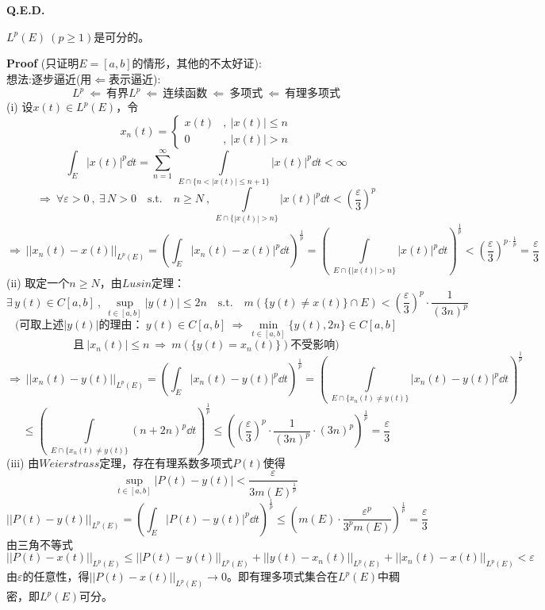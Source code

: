 \textbf{Q.E.D.}
\begin{theorem}
    $L^p(E) \ (p \geq 1)$是可分的。
\end{theorem}
\textbf{Proof} (只证明$E=[a,b]$的情形，其他的不太好证):\\
想法:逐步逼近(用$\Leftarrow$表示逼近):
\[L^p \ \Leftarrow \ \text{有界}L^p \ \Leftarrow \ \text{连续函数} \ \Leftarrow \ \text{多项式} \ \Leftarrow \ \text{有理多项式}\]
(i) 设$x(t) \in L^p(E)$，令
\[x_n(t)=\left \{
\begin{array}{ll}
    x(t) & , \ |x(t)| \leq n \\ 0 & , \ |x(t)|>n
\end{array}
\right.
\]
\[\int_E|x(t)|^p\dd t=\sum_{n=1}^{\infty} \ \int\limits_{E \cap \{n<|x(t)| \leq n+1\}}|x(t)|^p\dd t<\infty\]
\[\Rightarrow \ \forall \varepsilon>0 \ , \ \exists \, N>0 \quad \text{s.t.} \quad n \geq N \ , \ \int\limits_{E \cap \{|x(t)|>n\}}|x(t)|^p\dd t<\left(\frac{\varepsilon}{3}\right)^p\]
\[\Rightarrow \ ||x_n(t)-x(t)||_{L^p(E)}=\left(\int_E|x_n(t)-x(t)|^p\dd t\right)^{\frac{1}{p}}=\left( \ \int\limits_{E \cap \{|x(t)|>n\}}|x(t)|^p\dd t\right)^{\frac{1}{p}}<\left(\frac{\varepsilon}{3}\right)^{p \cdot \frac{1}{p}}=\frac{\varepsilon}{3}\]
(ii) 取定一个$n \geq N$，由$Lusin$定理：
\[\exists \, y(t) \in C[a,b] \ , \ \mathop \text{sup}\limits_{t \in [a,b]}|y(t)| \leq 2n \quad \text{s.t.} \quad m(\{y(t) \neq x(t)\} \cap E)<\left(\frac{\varepsilon}{3}\right)^p \cdot \frac{1}{(3n)^p}\]
\[(\text{可取上述$|y(t)|$的理由：} \ y(t) \in C[a,b] \ \Rightarrow \ \mathop \text{min}\limits_{t \in [a,b]}\{y(t),2n\} \in C[a,b]\]
\[\text{且} \ |x_n(t)| \leq n \ \Rightarrow \ m(\{y(t)=x_n(t)\})\text{不受影响})\]
\[\Rightarrow \ ||x_n(t)-y(t)||_{L^p(E)}=\left(\int_E|x_n(t)-y(t)|^p\dd t\right)^{\frac{1}{p}}=\left( \ \int\limits_{E \cap \{x_n(t) \neq y(t)\}}|x_n(t)-y(t)|^p\dd t\right)^{\frac{1}{p}}\]
\[\leq \left( \ \int\limits_{E \cap \{x_n(t) \neq y(t)\}}(n+2n)^p\dd t\right)^{\frac{1}{p}} \leq \left(\left(\frac{\varepsilon}{3}\right)^p \cdot \frac{1}{(3n)^p} \cdot (3n)^p\right)^{\frac{1}{p}}=\frac{\varepsilon}{3}\]
(iii) 由$Weierstrass$定理，存在有理系数多项式$P(t)$使得
\[\mathop \text{sup}\limits_{t \in [a,b]}|P(t)-y(t)|<\frac{\varepsilon}{3m(E)^{\frac{1}{p}}}\]
\[||P(t)-y(t)||_{L^p(E)}=\left(\int_E|P(t)-y(t)|^p\dd t\right)^{\frac{1}{p}} \leq \left(m(E) \cdot \frac{\varepsilon^p}{3^pm(E)}\right)^{\frac{1}{p}}=\frac{\varepsilon}{3}\]
由三角不等式
\[||P(t)-x(t)||_{L^p(E)} \leq ||P(t)-y(t)||_{L^p(E)}+||y(t)-x_n(t)||_{L^p(E)}+||x_n(t)-x(t)||_{L^p(E)}<\varepsilon\]
由$\varepsilon$的任意性，得$||P(t)-x(t)||_{L^p(E)} \to 0$。即有理多项式集合在$L^p(E)$中稠密，即$L^p(E)$可分。

